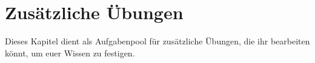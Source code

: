 \chapter{Zusätzliche Übungen}
\pagestyle{empty}
Dieses Kapitel dient als Aufgabenpool für zusätzliche Übungen, die ihr bearbeiten könnt, um euer Wissen zu festigen.

\pagestyle{fancy}
